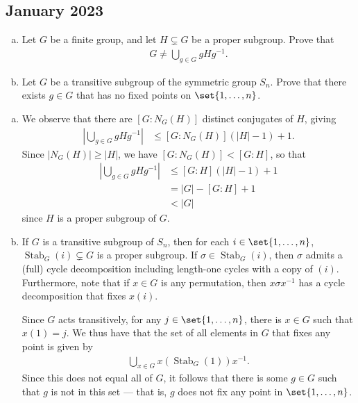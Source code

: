\documentclass[10pt]{mypackage}
\begin{document}
\subsection{January 2023}%
\begin{problem}[Problem 1]\hfill
  \begin{enumerate}[(a)]
    \item Let $G$ be a finite group, and let $H\subsetneq G$ be a proper subgroup. Prove that
      \begin{align*}
        G \neq \bigcup_{g\in G} gHg^{-1}.
      \end{align*}
    \item Let $G$ be a transitive subgroup of the symmetric group $S_n$. Prove that there exists $g\in G$ that has no fixed points on $\set{1,\dots,n}$.
  \end{enumerate}
\end{problem}
\begin{solution}\hfill
  \begin{enumerate}[(a)]
    \item We observe that there are $\left[ G:N_G(H) \right]$ distinct conjugates of $H$, giving
      \begin{align*}
        \left\vert \bigcup_{g\in G }gHg^{-1} \right\vert &\leq \left[ G:N_G(H) \right]\left( \left\vert H \right\vert-1 \right) + 1.
      \end{align*}
      Since $\left\vert N_G(H) \right\vert\geq \left\vert H \right\vert$, we have $\left[ G:N_G(H) \right] < \left[ G:H \right]$, so that
      \begin{align*}
        \left\vert \bigcup_{g\in G}gHg^{-1} \right\vert &\leq \left[ G:H \right]\left( \left\vert H \right\vert-1 \right) + 1\\
                                                        &= \left\vert G \right\vert- \left[ G:H \right] + 1\\
                                                        &< \left\vert G \right\vert
      \end{align*}
      since $H$ is a proper subgroup of $G$.
    \item If $G$ is a transitive subgroup of $S_n$, then for each $i\in \set{1,\dots,n}$, $\operatorname{Stab}_G(i)\subsetneq G$ is a proper subgroup. If $\sigma\in \operatorname{Stab}_G(i)$, then $\sigma$ admits a (full) cycle decomposition including length-one cycles with a copy of $\left( i \right)$. Furthermore, note that if $x\in G$ is any permutation, then $x\sigma x^{-1}$ has a cycle decomposition that fixes $x(i)$.

      Since $G$ acts transitively, for any $j\in \set{1,\dots,n}$, there is $x\in G$ such that $x(1) = j$. We thus have that the set of all elements in $G$ that fixes any point is given by
      \begin{align*}
        \bigcup_{x\in G} x \left( \operatorname{Stab}_G(1) \right)x^{-1}.
      \end{align*}
      Since this does not equal all of $G$, it follows that there is some $g\in G$ such that $g$ is not in this set --- that is, $g$ does not fix any point in $\set{1,\dots,n}$.
  \end{enumerate}
\end{solution}
\end{document}
